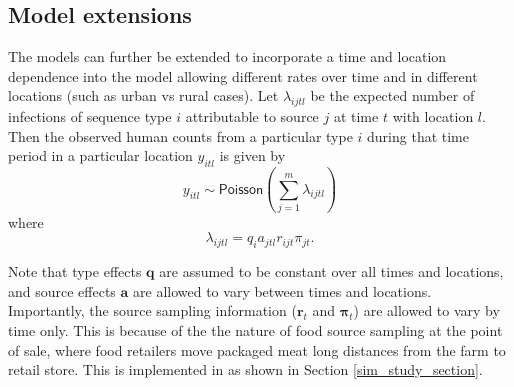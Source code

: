 \subsection{Model extensions} 

The models can further be extended to incorporate a time and location dependence into the model allowing different rates over time and in different locations (such as urban vs rural cases). Let $
\lambda_{ijtl}$ be the expected number of infections of sequence type $i$ attributable to source $j$ at time $t$ with location $l$. Then the observed human counts from a particular type $i$ during that 
time period in a particular location $y_{itl}$ is given by
$$
y_{itl}\sim \textsf{Poisson}(\sum_{j=1}^{m}\lambda_{ijtl})
$$
where
\begin{equation}
\lambda_{ijtl} = q_i a_{jtl} r_{ijt} \pi_{jt}.
\end{equation}

Note that type effects $\bm{q}$ are assumed to be constant over all times and locations, and source effects $\bm{a}$ are allowed to vary between times and locations.  Importantly, the source 
sampling information ($\bm{r}_t$ and $\bm{\pi}_t$) are allowed to vary by time only.  This is because of the the nature of food source sampling at the point of sale, where food retailers move 
packaged meat long distances from the farm to retail store.  This is implemented in  as shown in Section \ref{sim_study_section}.

